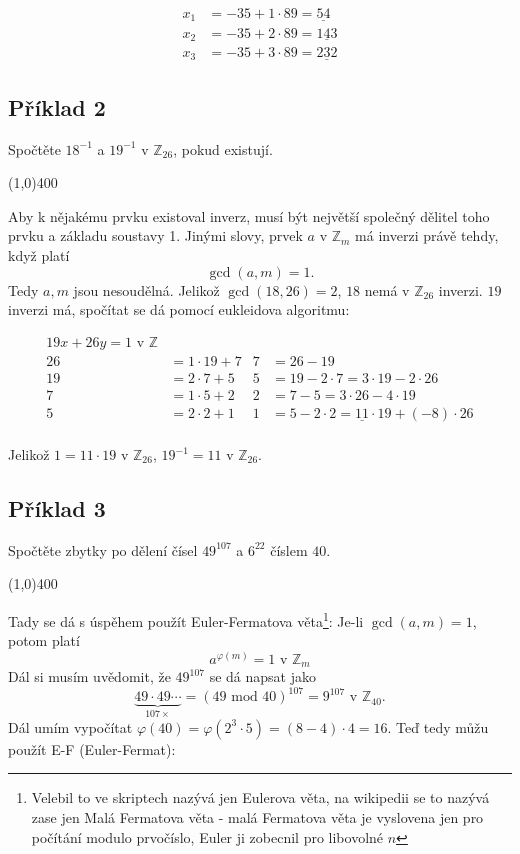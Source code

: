 \documentclass{article}
\begin{document}
\begin{align*}
x_1 &= -35 + 1\cdot 89 = \underline{54} \\
x_2 &= -35 + 2\cdot 89 = \underline{143} \\
x_3 &= -35 + 3\cdot 89 = \underline{232}
\end{align*} 

\subsection{Příklad 2}
Spočtěte $18^{-1}$ a $19^{-1}$ v $\mathbb{Z}_{26}$, pokud existují.

\line(1,0){400}

Aby k nějakému prvku existoval inverz, musí být největší společný dělitel toho prvku a základu soustavy 1. Jinými slovy, prvek $a$ v $\mathbb{Z}_m$ má inverzi právě tehdy, když platí
\begin{equation}
	 \gcd(a,m) = 1.
\end{equation}
Tedy \(a, m\) jsou nesoudělná. 
Jelikož $\gcd(18,26) = 2$, $18$ nemá v $\mathbb{Z}_{26}$ inverzi. $19$ inverzi má, spočítat se dá pomocí eukleidova algoritmu:

\begin{align*}
19x + 26y = 1 \mbox{ v } \mathbb{Z}&  	& 		&  \\
26 & = 1\cdot 19 + 7 					& 7		&= 26 - 19 \\
19 & = 2\cdot 7 + 5						& 5 	&= 19 - 2\cdot 7 = 3\cdot 19 - 2 \cdot 26 \\
7  & = 1\cdot 5 + 2						& 2 	&= 7 - 5 = 3\cdot 26 - 4 \cdot 19 \\
5  & = 2\cdot 2 + 1						& 1 	&= 5 - 2\cdot 2 = \underline{11}\cdot 19 + (-8) \cdot 26 \\
\end{align*}

Jelikož $1 = 11\cdot 19$ v $\mathbb{Z}_{26}$, $19^{-1} = 11$ v $\mathbb{Z}_{26}$.

\subsection{Příklad 3}
Spočtěte zbytky po dělení čísel $49^{107}$ a $6^{22}$ číslem $40$.

\line(1,0){400}

Tady se dá s úspěhem použít Euler-Fermatova věta\footnote{Velebil to ve skriptech nazývá jen Eulerova věta, na wikipedii se to nazývá zase jen Malá Fermatova věta - malá Fermatova věta je vyslovena jen pro počítání modulo prvočíslo, Euler ji zobecnil pro libovolné $n$}:
Je-li $\gcd(a,m) = 1$, potom platí
\begin{equation}
a^{\varphi(m)} = 1 \mbox{ v } \mathbb{Z}_m
\label{euler-fermat}
\end{equation}
Dál si musím uvědomit, že $49^{107}$ se dá napsat jako 
$$ \underbrace{49\cdot 49 \cdots}_{107 \times} = (49 \mbox{ mod } 40)^{107} = 9^{107} \mbox{ v } \mathbb{Z}_{40}.$$
Dál umím vypočítat $\varphi(40) = \varphi(2^3\cdot5) = (8-4)\cdot 4 = 16$. Teď tedy můžu použít E-F (Euler-Fermat):
\end{document}

